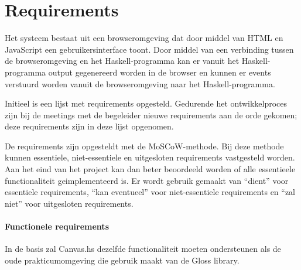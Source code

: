\chapter{Requirements} \label{hoofdstuk:requirements}


Het systeem bestaat uit een browseromgeving dat door middel van HTML en JavaScript een gebruikersinterface toont. Door middel van een verbinding tussen de browseromgeving en het Haskell-programma kan er vanuit het Haskell-programma output gegenereerd worden in de browser en kunnen er events verstuurd worden vanuit de browseromgeving naar het Haskell-programma.

Initieel is een lijst met requirements opgesteld. Gedurende het ontwikkelproces zijn bij de meetings met de begeleider nieuwe requirements aan de orde gekomen; deze requirements zijn in deze lijst opgenomen.

De requirements zijn opgesteldt met de MoSCoW-methode. Bij deze methode kunnen essentiele, niet-essentiele en uitgesloten requirements vastgesteld worden. Aan het eind van het project kan dan beter beoordeeld worden of alle essentieele functionaliteit geimplementeerd is.  Er wordt gebruik gemaakt van ``dient'' voor essentiele requirements, ``kan eventueel'' voor niet-essentiele requirements en ``zal niet'' voor uitgesloten requirements.

\subsubsection{Functionele requirements}
In de basis zal Canvas.hs dezelfde functionaliteit moeten ondersteunen als de oude prakticumomgeving die gebruik maakt van de Gloss library.

